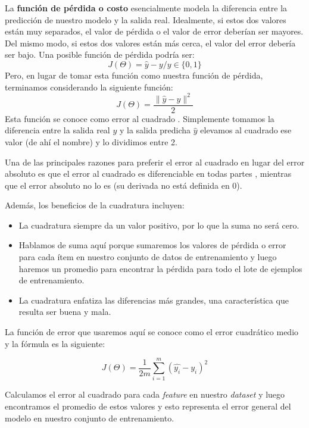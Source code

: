 \documentclass[a4paper,12pt]{article}
\begin{document}
La \textbf{función de pérdida o costo} esencialmente modela la diferencia entre la predicción de nuestro modelo y la salida real. Idealmente, si estos dos valores están muy separados, el valor de pérdida o el valor de error deberían ser mayores. Del mismo modo, si estos dos valores están más cerca, el valor del error debería ser bajo.
Una posible función de pérdida podría ser:
\begin{equation}
J(\Theta)=\hat{y}-y / y\in\{0,1\}
\end{equation}
Pero, en lugar de tomar esta función como nuestra función de pérdida, terminamos considerando la siguiente función:
\begin{equation}
J(\Theta)=\frac{\|\hat{y}-y\|^2}{2}
\end{equation}
Esta función se conoce como error al cuadrado . Simplemente tomamos la diferencia entre la salida real $y$ y la salida predicha $\hat{y}$ elevamos al cuadrado ese valor (de ahí el nombre) y lo dividimos entre 2.

Una de las principales razones para preferir el error al cuadrado en lugar del error absoluto es que el error al cuadrado es diferenciable en todas partes , mientras que el error absoluto no lo es (su derivada no está definida en 0).

Además, los beneficios de la cuadratura incluyen:
\begin{itemize}[noitemsep, topsep=2pt]
	\item La cuadratura siempre da un valor positivo, por lo que la suma no será cero.
	\item Hablamos de suma aquí porque sumaremos los valores de pérdida o error para cada ítem en nuestro conjunto de datos de entrenamiento y luego haremos un promedio para encontrar la pérdida para todo el lote de ejemplos de entrenamiento.
	\item La cuadratura enfatiza las diferencias más grandes, una característica que resulta ser buena y mala.
\end{itemize}

La función de error que usaremos aquí se conoce como el error cuadrático medio y la fórmula es la siguiente:

\begin{equation}
J(\Theta)=\frac{1}{2m} \sum_{i=1}^{m} (\hat{y_i}-y_i)^2
\label{funcperdida}
\end{equation}

Calculamos el error al cuadrado para cada \textit{feature} en nuestro \textit{dataset} y luego encontramos el promedio de estos valores y esto representa el error general del modelo en nuestro conjunto de entrenamiento.
\end{document}
